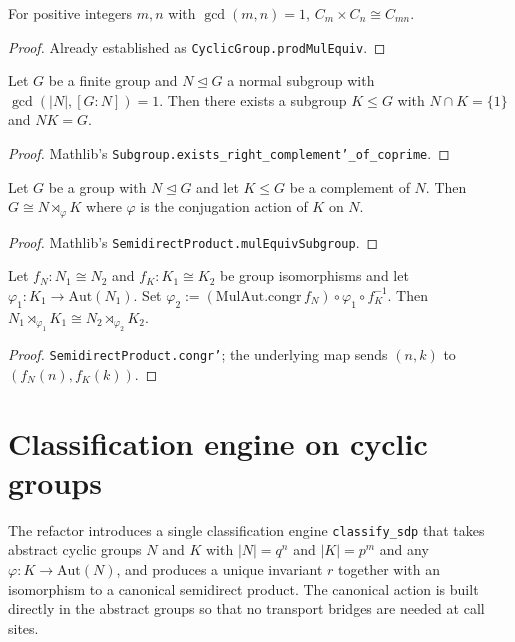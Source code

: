 \begin{lemma}
    \label{lem:cyclic-prod}
    For positive integers $m, n$ with $\gcd(m, n) = 1$,
    $C_m \times C_n \cong C_{mn}$.
\end{lemma}
\begin{proof}
    Already established as \texttt{CyclicGroup.prodMulEquiv}.
\end{proof}

\begin{lemma}
    \label{lem:schur-zassenhaus}
    Let $G$ be a finite group and $N \trianglelefteq G$ a normal subgroup
    with $\gcd(|N|, [G:N]) = 1$. Then there exists a subgroup $K \leq G$
    with $N \cap K = \{1\}$ and $NK = G$.
\end{lemma}
\begin{proof}
    Mathlib's \texttt{Subgroup.exists\_right\_complement'\_of\_coprime}.
\end{proof}

\begin{lemma}
    \label{lem:sdp-from-complement}
    Let $G$ be a group with $N \trianglelefteq G$ and let $K \leq G$ be a
    complement of $N$. Then $G \cong N \rtimes_\varphi K$ where $\varphi$ is
    the conjugation action of $K$ on $N$.
\end{lemma}
\begin{proof}
    Mathlib's \texttt{SemidirectProduct.mulEquivSubgroup}.
\end{proof}

\begin{lemma}
    \label{lem:sdp-congr}
    Let $f_N : N_1 \cong N_2$ and $f_K : K_1 \cong K_2$ be group isomorphisms
    and let $\varphi_1 : K_1 \to \mathrm{Aut}(N_1)$. Set
    $\varphi_2 := (\mathrm{MulAut.congr}\,f_N) \circ \varphi_1 \circ f_K^{-1}$.
    Then $N_1 \rtimes_{\varphi_1} K_1 \cong N_2 \rtimes_{\varphi_2} K_2$.
\end{lemma}
\begin{proof}
    \texttt{SemidirectProduct.congr'}; the underlying map sends
    $(n, k)$ to $(f_N(n), f_K(k))$.
\end{proof}

\section{Classification engine on cyclic groups}

The refactor introduces a single classification engine
\texttt{classify\_sdp} that takes abstract cyclic groups $N$ and $K$ with
$|N| = q^n$ and $|K| = p^m$ and any $\varphi : K \to \mathrm{Aut}(N)$, and
produces a unique invariant $r$ together with an isomorphism to a canonical
semidirect product. The canonical action is built directly in the abstract
groups so that no transport bridges are needed at call sites.

